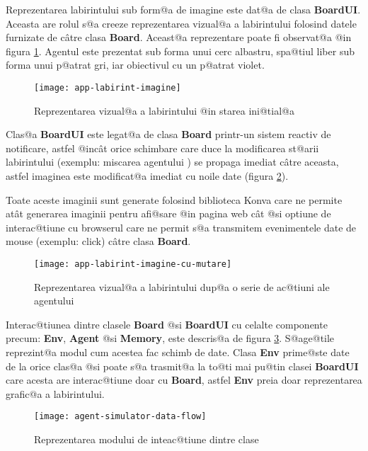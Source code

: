 Reprezentarea labirintului sub form@a de imagine este dat@a de clasa \textbf{BoardUI}. Aceasta are rolul s@a creeze reprezentarea vizual@a a labirintului folosind datele furnizate de c\^ atre clasa \textbf{Board}. Aceast@a reprezentare poate fi observat@a @in figura \ref{fig:labirint-imagine}. Agentul este prezentat sub forma unui cerc albastru, spa@tiul liber sub forma unui p@atrat gri, iar obiectivul cu un p@atrat violet.

\begin{figure}[h]
	\centering
	\texttt{[image: app-labirint-imagine]}
	\caption{Reprezentarea vizual@a a labirintului @in starea ini@tial@a}
	\label{fig:labirint-imagine}
\end{figure}

Clas@a \textbf{BoardUI} este legat@a de clasa \textbf{Board} printr-un sistem reactiv de notificare, astfel @inc\^ at orice schimbare care duce la modificarea st@arii labirintului (exemplu: miscarea agentului ) se propaga imediat c\^ atre aceasta, astfel imaginea este modificat@a imediat cu noile date (figura \ref{fig:labirint-imagine-cu-mutare}).

Toate aceste imaginii sunt generate folosind biblioteca Konva care ne permite at\^ at generarea imaginii pentru afi@sare @in pagina web c\^ at @si optiune de interac@tiune cu browserul care ne permit s@a transmitem evenimentele date de mouse (exemplu: click) c\^ atre clasa \textbf{Board}.

\begin{figure}[h]
	\centering
	\texttt{[image: app-labirint-imagine-cu-mutare]}
	\caption{Reprezentarea vizual@a a labirintului dup@a o serie de ac@tiuni ale agentului}
	\label{fig:labirint-imagine-cu-mutare}
\end{figure}

Interac@tiunea dintre clasele \textbf{Board} @si \textbf{BoardUI} cu celalte componente precum: \textbf{Env}, \textbf{Agent} @si \textbf{Memory}, este descris@a de figura \ref{fig:agent-simulator-data-flow}. S@age@tile reprezint@a modul cum acestea fac schimb de date. Clasa \textbf{Env} prime@ste date de la orice clas@a @si poate s@a trasmit@a la to@ti mai pu@tin clasei \textbf{BoardUI} care acesta are interac@tiune doar cu \textbf{Board}, astfel \textbf{Env} preia doar reprezentarea grafic@a a labirintului.

\begin{figure}[H]
	\centering
	\texttt{[image: agent-simulator-data-flow]}
	\caption{Reprezentarea modului de inteac@tiune dintre clase}
	\label{fig:agent-simulator-data-flow}
\end{figure}





